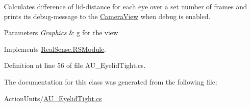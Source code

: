 Calculates difference of lid-\/distance for each eye over a set number of frames and prints its\textquotesingle{} debug-\/message to the \hyperlink{class_real_sense_1_1_camera_view}{Camera\+View} when debug is enabled. 
\begin{DoxyParams}{Parameters}
{\em Graphics} & g for the view \\
\hline
\end{DoxyParams}


Implements \hyperlink{class_real_sense_1_1_r_s_module_a2ec830b7932ee7c0077d473f81c73867}{Real\+Sense.\+R\+S\+Module}.



Definition at line 56 of file A\+U\+\_\+\+Eyelid\+Tight.\+cs.



The documentation for this class was generated from the following file\+:\begin{DoxyCompactItemize}
\item 
Action\+Units/\hyperlink{_a_u___eyelid_tight_8cs}{A\+U\+\_\+\+Eyelid\+Tight.\+cs}\end{DoxyCompactItemize}
